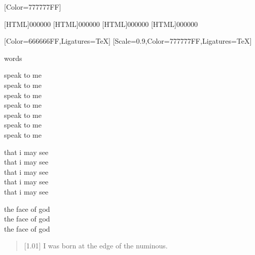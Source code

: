 \renewfontfamily{}[Color=777777FF]

[HTML]{000000}
[HTML]{000000}
[HTML]{000000}
[HTML]{000000}
\begin{paracol}{2}
[Color=666666FF,Ligatures=TeX]
\renewfontfamily{}[Scale=0.9,Color=777777FF,Ligatures=TeX]
\null
\vfill
\begin{center}
    words
\end{center}
\vfill
\newpage

\null
\vfill
\begin{center}
\begin{Spacing}{0}
speak to me\\\vspace{-7pt}
speak to me\\\vspace{-7pt}
speak to me\\\vspace{-7pt}
speak to me\\\vspace{-7pt}
speak to me\\\vspace{-7pt}
speak to me\\\vspace{-7pt}
speak to me

that i may see\\\vspace{-7pt}
that i may see\\\vspace{-7pt}
that i may see\\\vspace{-7pt}
that i may see\\\vspace{-7pt}
that i may see

the face of god\\\vspace{-7pt}
the face of god\\\vspace{-7pt}
the face of god
\end{Spacing}
\end{center}
\vfill
\newpage

\begin{verse}[1.01\textwidth]
    I was born at the edge of the numinous.\vspace{-7pt}


\end{verse}
\end{paracol}
